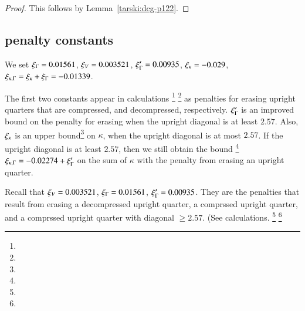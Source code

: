 \begin{proof}
This follows by Lemma~\ref{tarski:dcg-p122}.
\end{proof}


\subsection{penalty constants}

\begin{definition}
We set $\xi_\Gamma = 0.01561$, $\xi_V = 0.003521$, $\xi_\Gamma'=0.00935$,
$\xi_\kappa=-0.029$, $\xi_{\kappa,\Gamma} = \xi_\kappa+\xi_\Gamma = -0.01339$.
\end{definition}

The first two constants appear in calculations%
\footnote{} %
\footnote{} %
as penalties for erasing upright quarters that are compressed, and
decompressed, respectively. $\xi_\Gamma'$ is an improved bound on the
penalty for erasing when the upright diagonal is at least $2.57$.
Also, $\xi_\kappa$ is an upper bound\footnote{} %
 on $\kappa$, when the
upright diagonal is at most $2.57$.  If the upright diagonal is at
least $2.57$, then we still obtain the bound%
\footnote{} %
$\xi_{\kappa,\Gamma} =-0.02274+\xi_\Gamma'$ on the sum of $\kappa$ with the
penalty from erasing an upright quarter.

Recall that $\xi_V=0.003521$, $\xi_\Gamma=0.01561$, $\xi_\Gamma'=0.00935$. They are
the penalties that result from erasing a 
decompressed upright quarter, a comprssed upright quarter, 
and a comprssed upright quarter
with diagonal $\ge2.57$. (See calculations.%
\footnote{} %
\footnote{} %


